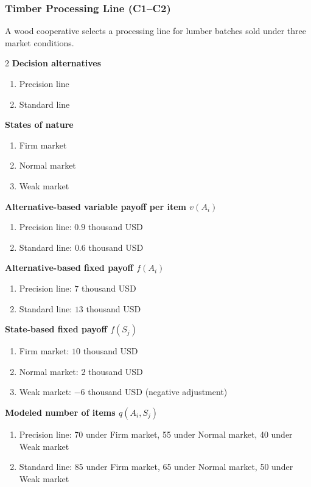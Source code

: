 	\subsubsection{Timber Processing Line (C1--C2)}
	\label{sec:problem31-timber-processing-line-c1-c2}
	A wood cooperative selects a processing line for lumber batches sold under three market conditions.
	\begin{multicols}{2}
	\textbf{Decision alternatives}
	\begin{enumerate}[label=\arabic*.]
\item Precision line
\item Standard line
	\end{enumerate}
	\textbf{States of nature}
	\begin{enumerate}[label=\arabic*.]
\item Firm market
\item Normal market
\item Weak market
	\end{enumerate}
	\columnbreak
	\textbf{Alternative-based variable payoff per item $v(A_i)$}
\begin{enumerate}[label=\arabic*.]
\item Precision line: $0.9$ thousand USD
\item Standard line: $0.6$ thousand USD\end{enumerate}
\textbf{Alternative-based fixed payoff $f(A_i)$}
\begin{enumerate}[label=\arabic*.]
\item Precision line: $7$ thousand USD
\item Standard line: $13$ thousand USD\end{enumerate}
\textbf{State-based fixed payoff $f(S_j)$}
\begin{enumerate}[label=\arabic*.]
\item Firm market: $10$ thousand USD
\item Normal market: $2$ thousand USD
\item Weak market: $-6$ thousand USD (negative adjustment)\end{enumerate}
\textbf{Modeled number of items $q(A_i,S_j)$}
\begin{enumerate}[label=\arabic*.]
\item Precision line: 70 under Firm market, 55 under Normal market, 40 under Weak market
\item Standard line: 85 under Firm market, 65 under Normal market, 50 under Weak market
\end{enumerate}
	\end{multicols}

